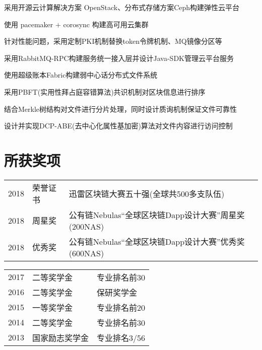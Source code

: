 \documentclass[]{deedy-resume-openfont}
\begin{document}
\begin{minipage}[t]{0.68\textwidth}
\begin{tightemize}
    \item 采用开源云计算解决方案 OpenStack、分布式存储方案Ceph构建弹性云平台
    \item 使用 pacemaker + corosync 构建高可用云集群
    \item 针对性能问题，采用定制PKI机制替换token令牌机制、MQ镜像分区等
    \item 采用RabbitMQ-RPC构建服务统一接入层并设计Java-SDK管理云平台服务
    \end{tightemize}
\sectionsep

\begin{tightemize}
    \item 使用超级账本Fabric构建弱中心话分布式文件系统
    \item 采用PBFT(实用性拜占庭容错算法)共识机制对区块信息进行排序
    \item 结合Merkle树结构对文件进行分片处理，同时设计质询机制保证文件可靠性
    \item 设计并实现DCP-ABE(去中心化属性基加密)算法对文件内容进行访问控制
    \end{tightemize}
\sectionsep

\section{所获奖项}
\begin{tabular}{rll}
2018         & 荣誉证书  & 迅雷区块链大赛五十强(全球共500多支队伍) \\
2018         & 周星奖 & 公有链Nebulas“全球区块链Dapp设计大赛”周星奖(200NAS) \\
2018         & 优秀奖 & 公有链Nebulas“全球区块链Dapp设计大赛”优秀奖(600NAS) \\
\end{tabular}
\begin{tabular}{rll}
2017         & 二等奖学金 & 专业排名前{30} \\
2016         & 二等奖学金 & 保研奖学金 \\
2015         & 一等奖学金 & 专业排名前{20} \\
2014         & 二等奖学金 & 专业排名前{30} \\
2013         & 国家励志奖学金  & 专业排名{3/56} \\
\end{tabular}
\sectionsep


\sectionsep\end{minipage}
\end{document}
